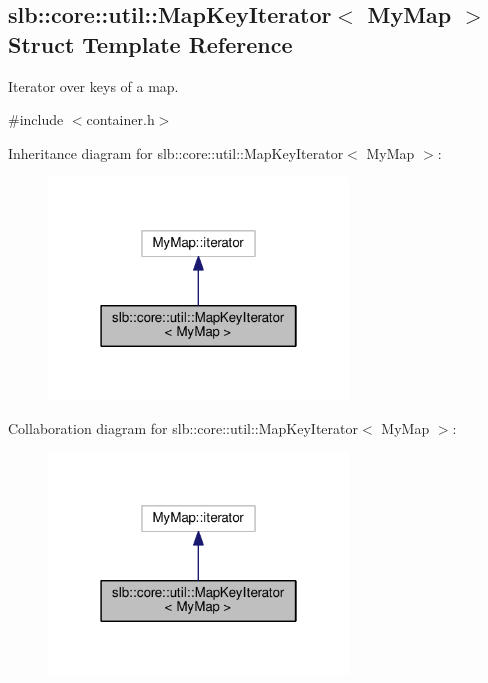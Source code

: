 \hypertarget{structslb_1_1core_1_1util_1_1MapKeyIterator}{}\subsection{slb\+:\+:core\+:\+:util\+:\+:Map\+Key\+Iterator$<$ My\+Map $>$ Struct Template Reference}
\label{structslb_1_1core_1_1util_1_1MapKeyIterator}


Iterator over keys of a map.  




{\ttfamily \#include $<$container.\+h$>$}



Inheritance diagram for slb\+:\+:core\+:\+:util\+:\+:Map\+Key\+Iterator$<$ My\+Map $>$\+:\nopagebreak
\begin{figure}[H]
\begin{center}
\leavevmode
\includegraphics[width=226pt]{structslb_1_1core_1_1util_1_1MapKeyIterator__inherit__graph}
\end{center}
\end{figure}


Collaboration diagram for slb\+:\+:core\+:\+:util\+:\+:Map\+Key\+Iterator$<$ My\+Map $>$\+:\nopagebreak
\begin{figure}[H]
\begin{center}
\leavevmode
\includegraphics[width=226pt]{structslb_1_1core_1_1util_1_1MapKeyIterator__coll__graph}
\end{center}
\end{figure}
